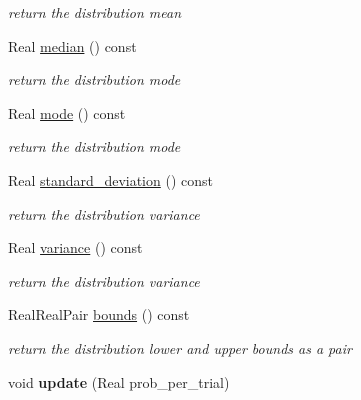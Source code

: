 \begin{DoxyCompactItemize}
\begin{DoxyCompactList}\small\item\em return the distribution mean \end{DoxyCompactList}\item 
Real \hyperlink{classPecos_1_1GeometricRandomVariable_ae1fff19ce29a79d657043a598523635d}{median} () const \label{classPecos_1_1GeometricRandomVariable_ae1fff19ce29a79d657043a598523635d}

\begin{DoxyCompactList}\small\item\em return the distribution mode \end{DoxyCompactList}\item 
Real \hyperlink{classPecos_1_1GeometricRandomVariable_a72d3d6926edd929cb3f8e12baa655f70}{mode} () const \label{classPecos_1_1GeometricRandomVariable_a72d3d6926edd929cb3f8e12baa655f70}

\begin{DoxyCompactList}\small\item\em return the distribution mode \end{DoxyCompactList}\item 
Real \hyperlink{classPecos_1_1GeometricRandomVariable_a6a4ed9624d511f8a4e4f509c82cb0706}{standard\+\_\+deviation} () const \label{classPecos_1_1GeometricRandomVariable_a6a4ed9624d511f8a4e4f509c82cb0706}

\begin{DoxyCompactList}\small\item\em return the distribution variance \end{DoxyCompactList}\item 
Real \hyperlink{classPecos_1_1GeometricRandomVariable_a4b8b05b2a9af92dad9cc304c2925a4eb}{variance} () const \label{classPecos_1_1GeometricRandomVariable_a4b8b05b2a9af92dad9cc304c2925a4eb}

\begin{DoxyCompactList}\small\item\em return the distribution variance \end{DoxyCompactList}\item 
Real\+Real\+Pair \hyperlink{classPecos_1_1GeometricRandomVariable_a4bdb95a8fa5fffaa0de5102f56963cf2}{bounds} () const \label{classPecos_1_1GeometricRandomVariable_a4bdb95a8fa5fffaa0de5102f56963cf2}

\begin{DoxyCompactList}\small\item\em return the distribution lower and upper bounds as a pair \end{DoxyCompactList}\item 
void {\bfseries update} (Real prob\+\_\+per\+\_\+trial)\label{classPecos_1_1GeometricRandomVariable_a4f30d171bfc33f654cb85d1c5f23046a}

\end{DoxyCompactItemize}
